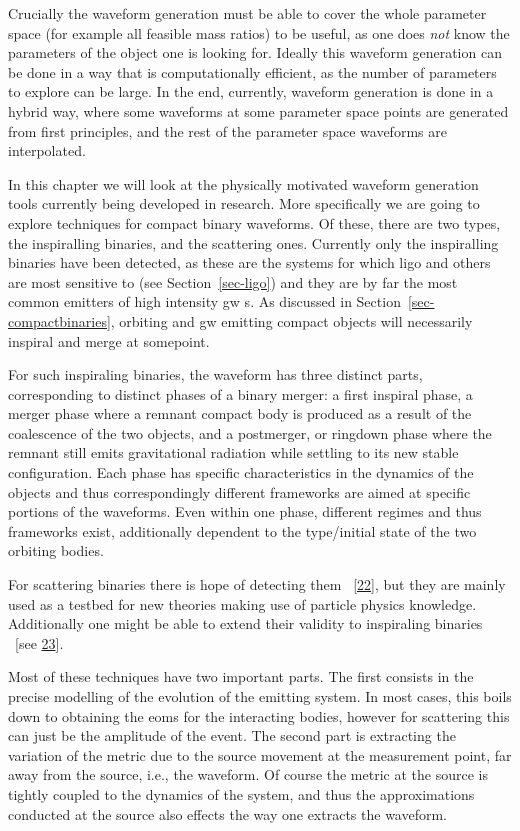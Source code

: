 \documentclass[
  10pt,
  a4paper,
  DIV=11,
  numbers=noendperiod,
  twoside]{scrreprt}
\DeclareRobustCommand{\[}{\begin{equation}}
\DeclareRobustCommand{\]}{\end{equation}}
\begin{document}
Crucially the waveform generation must be able to cover the whole
parameter space (for example all feasible mass ratios) to be useful, as
one does \emph{not} know the parameters of the object one is looking
for. Ideally this waveform generation can be done in a way that is
computationally efficient, as the number of parameters to explore can be
large. In the end, currently, waveform generation is done in a hybrid
way, where some waveforms at some parameter space points are generated
from first principles, and the rest of the parameter space waveforms are
interpolated.

In this chapter we will look at the physically motivated waveform
generation tools currently being developed in research. More
specifically we are going to explore techniques for compact binary
waveforms. Of these, there are two types, the inspiralling binaries, and
the scattering ones. Currently only the inspiralling binaries have been
detected, as these are the systems for which \gls{ligo} and others are
most sensitive to (see Section~\ref{sec-ligo}) and they are by far the
most common emitters of high intensity \gls{gw} s. As discussed in
Section~\ref{sec-compactbinaries}, orbiting and \gls{gw} emitting
compact objects will necessarily inspiral and merge at somepoint.

For such inspiraling binaries, the waveform has three distinct parts,
corresponding to distinct phases of a binary merger: a first inspiral
phase, a merger phase where a remnant compact body is produced as a
result of the coalescence of the two objects, and a postmerger, or
ringdown phase where the remnant still emits gravitational radiation
while settling to its new stable configuration. Each phase has specific
characteristics in the dynamics of the objects and thus correspondingly
different frameworks are aimed at specific portions of the waveforms.
Even within one phase, different regimes and thus frameworks exist,
additionally dependent to the type/initial state of the two orbiting
bodies.

For scattering binaries there is hope of detecting them
~{[}\protect\hyperlink{ref-Mukherjee:2020hnm}{22}{]}, but they are
mainly used as a testbed for new theories making use of particle physics
knowledge. Additionally one might be able to extend their validity to
inspiraling binaries ~{[}see
\protect\hyperlink{ref-Kalin:2019rwq}{23}{]}.

Most of these techniques have two important parts. The first consists in
the precise modelling of the evolution of the emitting system. In most
cases, this boils down to obtaining the \glspl{eom} for the interacting
bodies, however for scattering this can just be the amplitude of the
event. The second part is extracting the variation of the metric due to
the source movement at the measurement point, far away from the source,
i.e., the waveform. Of course the metric at the source is tightly
coupled to the dynamics of the system, and thus the approximations
conducted at the source also effects the way one extracts the waveform.
\end{document}
